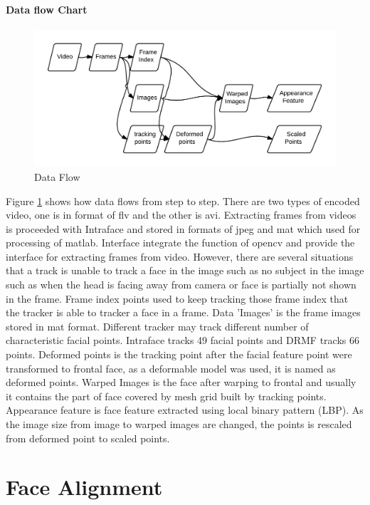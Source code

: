 \paragraph{Data flow Chart}
\begin{figure}[ht]
\centering
\includegraphics[width=\textwidth]{imgs/DataFlowChart.png}
\caption{Data Flow}
\label{fig:DF}
\end{figure}
Figure \ref{fig:DF} shows how data flows from step to step. There are two types of encoded video, one is in format of flv and the other is avi. Extracting frames from videos is proceeded with Intraface and stored in formats of jpeg and mat which used for processing of matlab. Interface integrate the function of opencv and provide the interface for extracting frames from video. However, there are several situations that a track is unable to track a face in the image such as no subject in the image such as when the head is facing away from camera or face is partially not shown in the frame. Frame index points used to keep tracking those frame index that the tracker is able to tracker a face in a frame. Data 'Images' is the frame images stored in mat format. Different tracker may track different number of characteristic facial points. Intraface tracks 49 facial points and DRMF tracks 66 points. Deformed points is the tracking point after the facial feature point were transformed to frontal face, as a deformable model was used, it is named as deformed points. Warped Images is the face after warping to frontal and usually it contains the part of face covered by mesh grid built by tracking points. Appearance feature is face feature extracted using local binary pattern (LBP). As the image size from image to warped images are changed, the points is rescaled from deformed point to scaled points.

\section{Face Alignment}

